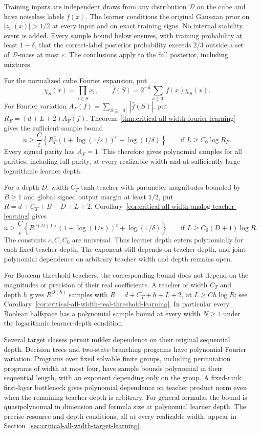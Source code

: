 \documentclass[11pt]{article}
\begin{document}
Training inputs are independent draws from any distribution
$\mathcal D$ on the cube and have noiseless labels $f(x)$. The learner
conditions the original Gaussian prior on $|z_w(x)|>1/2$ at every input
and on exact training signs. No internal stability event is added.
Every sample bound below ensures, with training probability at least
$1-\delta$, that the correct-label posterior probability exceeds $2/3$
outside a set of $\mathcal D$-mass at most $\varepsilon$.
The conclusions apply to the full posterior, including mixtures.

For the normalized cube Fourier expansion, put
\[
 \chi_S(x)=\prod_{i\in S}x_i,\qquad
 \widehat f(S)=2^{-d}\sum_{x\in\mathcal X}f(x)\chi_S(x).
\]
For Fourier variation
$A_F(f)=\sum_{S\subseteq[d]}|\widehat f(S)|$, put
$R_F=(d+L+2)A_F(f)$. Theorem~\ref{thm:critical-all-width-fourier-learning}
gives the sufficient sample bound
\[
 n\ge\frac C\varepsilon\left\{
 R_F^c(1+\log(1/\varepsilon))^c+\log(1/\delta)\right\}
 \qquad\text{if }L\ge C_0\log R_F.
\]
Every signed parity has $A_F=1$. This therefore gives polynomial
samples for all parities, including full parity, at every realizable
width and at sufficiently large logarithmic learner depth.

For a depth-$D$, width-$C_T$ tanh teacher with parameter magnitudes
bounded by $B\ge1$ and global signed output margin at least $1/2$, put
$R=d+C_T+B+D+L+2$. Corollary~\ref{cor:critical-all-width-analog-teacher-learning}
gives
\[
 n\ge\frac C\varepsilon\left\{
 R^{c(D+1)}(1+\log(1/\varepsilon))^c+\log(1/\delta)\right\}
 \qquad\text{if }L\ge C_0(D+1)\log R.
\]
The constants $c,C,C_0$ are universal. Thus learner depth enters
polynomially for each fixed teacher depth. The exponent still depends
on teacher depth, and joint polynomial dependence on arbitrary teacher
width and depth remains open.

For Boolean threshold teachers, the corresponding bound does not depend
on the magnitudes or precision of their real coefficients. A teacher of
width $C_T$ and depth $h$ gives $R^{O(h)}$ samples with
$R=d+C_T+h+L+2$, at $L\ge Ch\log R$; see
Corollary~\ref{cor:critical-all-width-real-threshold-learning}.
In particular every Boolean halfspace has a polynomial sample bound
at every width $N\ge1$ under the logarithmic learner-depth condition.

Several target classes permit milder dependence on their original
sequential depth. Decision trees and two-state branching programs have
polynomial Fourier variation. Programs over fixed solvable finite groups,
including permutation programs of width at most four, have sample bounds
polynomial in their sequential length, with an exponent depending only on
the group. A fixed-rank first-layer bottleneck gives
polynomial dependence on teacher product norm even when the remaining
teacher depth is arbitrary. For general formulas the bound is quasipolynomial in dimension and
formula size at polynomial learner depth.
The precise resource and depth conditions, all at every realizable width,
appear in Section~\ref{sec:critical-all-width-target-learning}.
\end{document}
